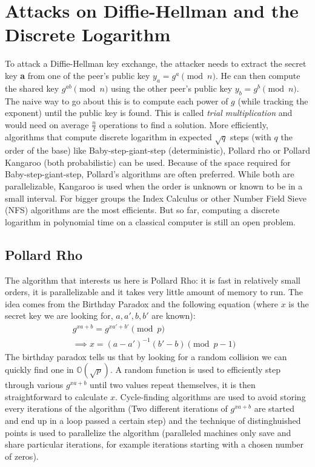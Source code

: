 \documentclass[a4paper,11pt,twocolumn]{article}
\begin{document}
\section{Attacks on Diffie-Hellman and the Discrete Logarithm}

To attack a Diffie-Hellman key exchange, the attacker needs to extract the secret key \textbf{a} from one of the peer's public key $y_a = g^a \pmod{n}$. He can then compute the shared key $g^{ab} \pmod{n}$ using the other peer's public key $y_b = g^b \pmod{n}$.\\

The naive way to go about this is to compute each power of $g$ (while tracking the exponent) until the public key is found. This is called \emph{trial multiplication} and would need on average $\frac{n}{2}$ operations to find a solution.
More efficiently, algorithms that compute discrete logarithm in expected $\sqrt{q}$ steps (with $q$ the order of the base) like Baby-step-giant-step (deterministic), Pollard rho or Pollard Kangaroo (both probabilistic) can be used. Because of the space required for Baby-step-giant-step, Pollard's algorithms are often preferred. While both are parallelizable, Kangaroo is used when the order is unknown or known to be in a small interval. For bigger groups the Index Calculus or other Number Field Sieve (NFS) algorithms are the most efficients. But so far, computing a discrete logarithm in polynomial time on a classical computer is still an open problem.\\

\subsection{Pollard Rho}

The algorithm that interests us here is Pollard Rho: it is fast in relatively small orders, it is parallelizable and it takes very little amount of memory to run. The idea comes from the Birthday Paradox and the following equation (where $x$ is the secret key we are looking for, $a, a', b, b'$ are known):
\begin{align*}
  g^{xa +b } = g^{xa' + b'} \pmod{p}&\\
  \implies x = (a-a')^{-1} (b' - b) \pmod{p-1}&
\end{align*}
The birthday paradox tells us that by looking for a random collision we can quickly find one in $\mathbb{O}(\sqrt{p})$. A random function is used to efficiently step through various $g^{xa + b}$ until two values repeat themselves, it is then straightforward to calculate $x$. Cycle-finding algorithms are used to avoid storing every iterations of the algorithm (Two different iterations of $g^{xa+b}$ are started and end up in a loop passed a certain step) and the technique of distinghuished points is used to parallelize the algorithm (paralleled machines only save and share particular iterations, for example iterations starting with a chosen number of zeros).
\end{document}
